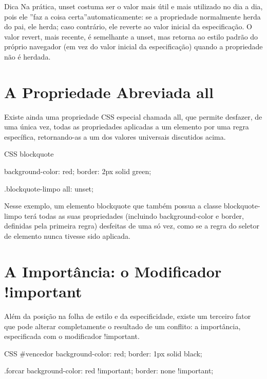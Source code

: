 \begin{infobox}{Dica}
Na prática, unset costuma ser o valor mais útil e mais utilizado no dia a dia, pois ele ”faz a coisa certa”automaticamente: se a propriedade normalmente herda do pai, ele herda; caso contrário, ele reverte ao valor inicial da especificação. O valor revert, mais recente, é semelhante a unset, mas retorna ao estilo padrão do próprio navegador (em vez do valor inicial da especificação) quando a propriedade não é herdada.
\end{infobox}

\section{A Propriedade Abreviada all}

Existe ainda uma propriedade CSS especial chamada all, que permite desfazer, de uma única vez, todas as propriedades aplicadas a um elemento por uma regra específica, retornando-as a um dos valores universais discutidos acima.

\begin{codebox}{CSS}
blockquote {
  background-color: red;
  border: 2px solid green;



}

.blockquote-limpo {
  all: unset;
}
\end{codebox}

Nesse exemplo, um elemento blockquote que também possua a classe blockquote-limpo terá todas as suas propriedades (incluindo background-color e border, definidas pela primeira regra) desfeitas de uma só vez, como se a regra do seletor de elemento nunca tivesse sido aplicada.

\section{A Importância: o Modificador !important}

Além da posição na folha de estilo e da especificidade, existe um terceiro fator que pode alterar completamente o resultado de um conflito: a importância, especificada com o modificador !important.

\begin{codebox}{CSS}
#vencedor {
  background-color: red;
  border: 1px solid black;
}

.forcar {
  background-color: red !important;
  border: none !important;
}
\end{codebox}

